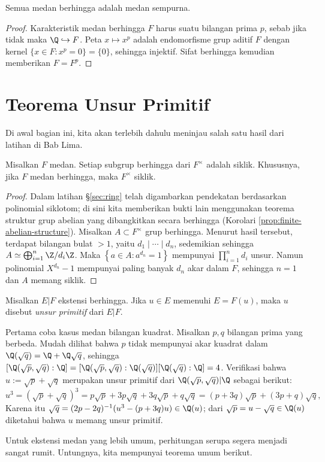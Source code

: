 \begin{corollary}
	Semua medan berhingga adalah medan sempurna.
\end{corollary}
\begin{proof}
	Karakteristik medan berhingga $F$ harus suatu bilangan prima $p$, sebab jika tidak maka $\Q \hookrightarrow F$. Peta $x \mapsto x^p$ adalah endomorfisme grup aditif $F$ dengan kernel $\{x \in F: x^p=0 \} = \{0\}$, sehingga injektif. Sifat berhingga kemudian memberikan $F=F^p$.
\end{proof}

\section{Teorema Unsur Primitif}
Di awal bagian ini, kita akan terlebih dahulu meninjau salah satu hasil dari latihan di Bab Lima.
\begin{theorem}\label{prop:field-subgroup-cyclic}
	Misalkan $F$ medan. Setiap subgrup berhingga dari $F^\times$ adalah siklik. Khususnya, jika $F$ medan berhingga, maka $F^\times$ siklik.
\end{theorem}
\begin{proof}
	Dalam latihan \S\ref{sec:ring} telah digambarkan pendekatan berdasarkan polinomial siklotom; di sini kita memberikan bukti lain menggunakan teorema struktur grup abelian yang dibangkitkan secara berhingga (Korolari \ref{prop:finite-abelian-structure}). Misalkan $A \subset F^\times$ grup berhingga. Menurut hasil tersebut, terdapat bilangan bulat $> 1$, yaitu $d_1 \mid \cdots \mid d_n$, sedemikian sehingga $A \simeq \bigoplus_{i=1}^n \Z/d_i\Z$. Maka $\left\{a\in A: a^{d_n}=1 \right\}$ mempunyai $\prod_{i=1}^n d_i$ unsur. Namun polinomial $X^{d_n}-1$ mempunyai paling banyak $d_n$ akar dalam $F$, sehingga $n=1$ dan $A$ memang siklik.
\end{proof}

\begin{definition}
	Misalkan $E|F$ ekstensi berhingga. Jika $u \in E$ memenuhi $E=F(u)$, maka $u$ disebut \emph{unsur primitif} dari $E|F$.
\end{definition}

\begin{example}
	Pertama coba kasus medan bilangan kuadrat. Misalkan $p,q$ bilangan prima yang berbeda. Mudah dilihat bahwa $p$ tidak mempunyai akar kuadrat dalam $\Q(\sqrt{q}) = \Q + \Q\sqrt{q}$, sehingga $[\Q(\sqrt{p},\sqrt{q}): \Q] = [\Q(\sqrt{p},\sqrt{q}):\Q(\sqrt{q})] [\Q(\sqrt{q}):\Q] = 4$. Verifikasi bahwa $u := \sqrt{p}+\sqrt{q}$ merupakan unsur primitif dari $\Q(\sqrt{p}, \sqrt{q})|\Q$ sebagai berikut:
	\[ u^3 = \left( \sqrt{p}+\sqrt{q} \right)^3 = p\sqrt{p} + 3p\sqrt{q} + 3q\sqrt{p} + q\sqrt{q} = (p+3q)\sqrt{p} + (3p+q)\sqrt{q}, \]
	Karena itu $\sqrt{q} = (2p-2q)^{-1}(u^3 - (p+3q)u) \in \Q(u)$; dari $\sqrt{p} = u - \sqrt{q} \in \Q(u)$ diketahui bahwa $u$ memang unsur primitif.
\end{example}
Untuk ekstensi medan yang lebih umum, perhitungan serupa segera menjadi sangat rumit. Untungnya, kita mempunyai teorema umum berikut.

